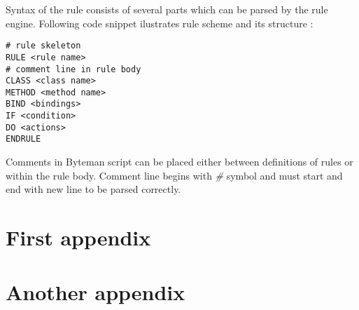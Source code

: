 \documentclass[12pt,oneside]{fithesis2}
\begin{document}
Syntax of the rule consists of several parts which can be parsed by the rule engine. Following code snippet ilustrates rule scheme and its structure \cite[Rule Events]{byteman_doc}:

\begin{lstlisting}[caption = Byteman rule scheme, label = byteman_scheme]
# rule skeleton
RULE <rule name>
# comment line in rule body
CLASS <class name>
METHOD <method name>
BIND <bindings>
IF <condition>
DO <actions>
ENDRULE
\end{lstlisting}

Comments in Byteman script can be placed either between definitions of rules or within the rule body. Comment line begins with \textit{\#} symbol and must start and end with new line to be parsed correctly.

    \appendix
    \chapter{First appendix}        %
    \Blindtext
    \chapter{Another appendix}
    \Blindtext



\end{document}
